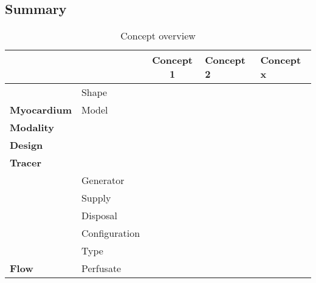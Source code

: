\subsection{Summary}
\begin{table}[H]
\caption{Concept overview}
\begin{tabular}{l|llll}
\textbf{}                                                  &                               & \multicolumn{1}{c}{Concept 1} & Concept 2                & Concept x                                     \\ \hline
\multicolumn{1}{c|}{}                                      & \cellcolor{red}Shape &\cellcolor{red}      & \cellcolor{red} & \multicolumn{1}{l|}{\cellcolor{red}} \\
\multicolumn{1}{c|}{\multirow{-2}{*}{\textbf{Myocardium}}} & Model                         &                               &                          & \multicolumn{1}{l|}{}                         \\
\textbf{Modality}                                          & \cellcolor{red}      & \cellcolor{red}      & \cellcolor{red} & \multicolumn{1}{l|}{\cellcolor{red}} \\
\textbf{Design}                                            &                               &                               &                          & \multicolumn{1}{l|}{}                         \\
\textbf{Tracer}                                            & \cellcolor{red}      & \cellcolor{red}      & \cellcolor{red} & \multicolumn{1}{l|}{\cellcolor{red}} \\
                                                           & Generator                     &                               &                          & \multicolumn{1}{l|}{}                         \\
                                                           & Supply                        &                               &                          & \multicolumn{1}{l|}{}                         \\
                                                           & Disposal                      &                               &                          & \multicolumn{1}{l|}{}                         \\
                                                           & Configuration                 &                               &                          & \multicolumn{1}{l|}{}                         \\
                                                           & \cellcolor{red}Type  & \cellcolor{red}      & \cellcolor{red} & \multicolumn{1}{l|}{\cellcolor{red}} \\
\multirow{-6}{*}{\textbf{Flow}}                            & Perfusate                     &                               &                          & \multicolumn{1}{l|}{}                         \\ \cline{2-5} 
\end{tabular}
\end{table}
